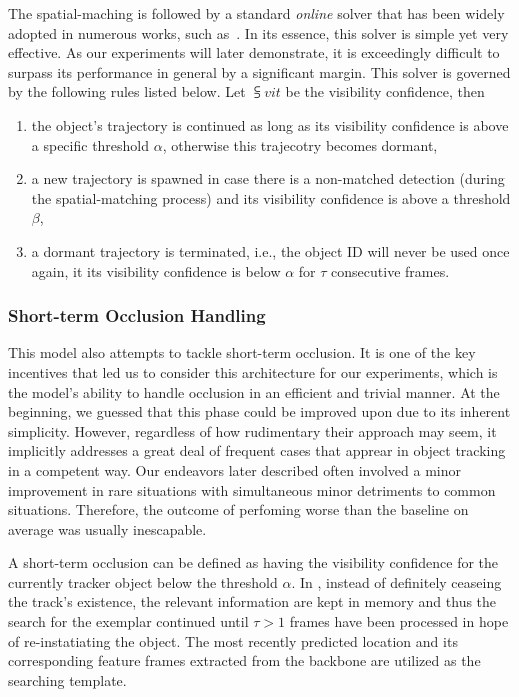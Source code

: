 The spatial-maching is followed by a standard \emph{online} solver that has been widely adopted in numerous works, such as~\cite{bawley2016simple, wojke2017simple, zhou2020tracking, bergmann2019tracking}. In its essence, this solver is simple yet very effective. As our experiments will later demonstrate, it is exceedingly difficult to surpass its performance in general by a significant margin. This solver is governed by the following rules listed below. Let $\subsup{v}{i}{t}$ be the visibility confidence, then
\begin{enumerate}
    \item the object's trajectory is continued as long as its visibility confidence is above a specific threshold $\alpha$, otherwise this trajecotry becomes dormant,
    \item a new trajectory is spawned in case there is a non-matched detection (during the spatial-matching process) and its visibility confidence is above a threshold $\beta$,
    \item a dormant trajectory is terminated, i.e., the object ID will never be used once again, it its visibility confidence is below $\alpha$ for $\tau$ consecutive frames.
\end{enumerate}

\subsubsection{Short-term Occlusion Handling}

This model also attempts to tackle short-term occlusion. It is one of the key incentives that led us to consider this architecture for our experiments, which is the model's ability to handle occlusion in an efficient and trivial manner. At the beginning, we guessed that this phase could be improved upon due to its inherent simplicity. However, regardless of how rudimentary their approach may seem, it implicitly addresses a great deal of frequent cases that apprear in object tracking in a competent way. Our endeavors later described often involved a minor improvement in rare situations with simultaneous minor detriments to common situations. Therefore, the outcome of perfoming worse than the baseline on average was usually inescapable.

A short-term occlusion can be defined as having the visibility confidence for the currently tracker object below the threshold $\alpha$. In \siammot{}, instead of definitely ceaseing the track's existence, the relevant information are kept in memory and thus the search for the exemplar continued until $\tau > 1$ frames have been processed in hope of re-instatiating the object. The most recently predicted location and its corresponding feature frames extracted from the backbone are utilized as the searching template.

